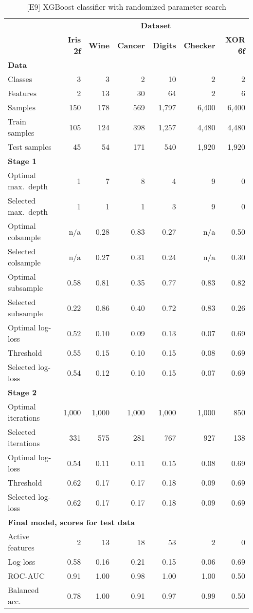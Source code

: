 %
\begin{table}
\caption{[E9] XGBoost classifier with randomized parameter search}
\label{tab_e9}
%
\begin{center}
\small
\begin{tabular}{|lrrrrrr|}
\hline
&\multicolumn{6}{c|}{\textbf{\hrulefill\ Dataset \hrulefill}}\\
&\textbf{Iris 2f}&\textbf{Wine}&\textbf{Cancer}&\textbf{Digits}&\textbf{Checker}&\textbf{XOR 6f}\\
\multicolumn{7}{|l|}{\textbf{Data}}\\
Classes&3&3&2&10&2&2\\
Features&2&13&30&64&2&6\\
Samples&150&178&569&1,797&6,400&6,400\\
Train samples&105&124&398&1,257&4,480&4,480\\
Test samples&45&54&171&540&1,920&1,920\\
\multicolumn{7}{|l|}{\textbf{Stage 1}}\\
Optimal max.\ depth&1&7&8&4&9&0\\
Selected max.\ depth&1&1&1&3&9&0\\
Optimal colsample&n/a&0.28&0.83&0.27&n/a&0.50\\
Selected colsample&n/a&0.27&0.31&0.24&n/a&0.30\\
Optimal subsample&0.58&0.81&0.35&0.77&0.83&0.82\\
Selected subsample&0.22&0.86&0.40&0.72&0.83&0.26\\
Optimal log-loss&0.52&0.10&0.09&0.13&0.07&0.69\\
Threshold&0.55&0.15&0.10&0.15&0.08&0.69\\
Selected log-loss&0.54&0.12&0.10&0.15&0.07&0.69\\
\multicolumn{7}{|l|}{\textbf{Stage 2}}\\
Optimal iterations&1,000&1,000&1,000&1,000&1,000&850\\
Selected iterations&331&575&281&767&927&138\\
Optimal log-loss&0.54&0.11&0.11&0.15&0.08&0.69\\
Threshold&0.62&0.17&0.17&0.18&0.09&0.69\\
Selected log-loss&0.62&0.17&0.17&0.18&0.09&0.69\\
\multicolumn{7}{|l|}{\textbf{Final model, scores for test data}}\\
Active features&2&13&18&53&2&0\\
Log-loss&0.58&0.16&0.21&0.15&0.06&0.69\\
ROC-AUC&0.91&1.00&0.98&1.00&1.00&0.50\\
Balanced acc.&0.78&1.00&0.91&0.97&0.99&0.50\\
\hline
\end{tabular}
\end{center}
\end{table}
